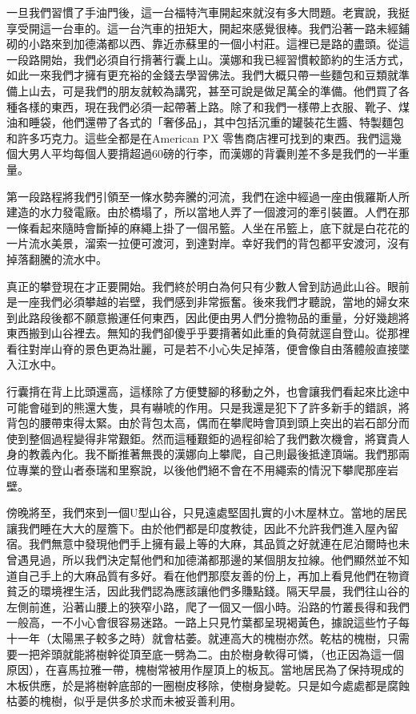 一旦我們習慣了手油門後，這一台福特汽車開起來就沒有多大問題。老實說，我挺享受開這一台車的。這一台汽車的扭矩大，開起來感覺很棒。我們沿著一路未經鋪砌的小路來到加德滿都以西、靠近赤蘇里的一個小村莊。這裡已是路的盡頭。從這一段路開始，我們必須自行揹著行囊上山。漢娜和我已經習慣較節約的生活方式，如此一來我們才擁有更充裕的金錢去學習佛法。我們大概只帶一些麵包和豆類就準備上山去，可是我們的朋友就較為講究，甚至可說是做足萬全的準備。他們買了各種各樣的東西，現在我們必須一起帶著上路。除了和我們一樣帶上衣服、靴子、煤油和睡袋，他們還帶了各式的「奢侈品」，其中包括沉重的罐裝花生醬、特製麵包和許多巧克力。這些全都是在American
PX
零售商店裡可找到的東西。我們這幾個大男人平均每個人要揹超過60磅的行李，而漢娜的背囊則差不多是我們的一半重量。


第一段路程將我們引領至一條水勢奔騰的河流，我們在途中經過一座由俄羅斯人所建造的水力發電廠。由於橋塌了，所以當地人弄了一個渡河的牽引裝置。人們在那一條看起來隨時會斷掉的麻繩上掛了一個吊籃。人坐在吊籃上，底下就是白花花的一片流水美景，溜索一拉便可渡河，到達對岸。幸好我們的背包都平安渡河，沒有掉落翻騰的流水中。

真正的攀登現在才正要開始。我們終於明白為何只有少數人曾到訪過此山谷。眼前是一座我們必須攀越的岩壁，我們感到非常振奮。後來我們才聽說，當地的婦女來到此路段後都不願意搬運任何東西，因此便由男人們分擔物品的重量，分好幾趟將東西搬到山谷裡去。無知的我們卻傻乎乎要揹著如此重的負荷就逕自登山。從那裡看往對岸山脊的景色更為壯麗，可是若不小心失足掉落，便會像自由落體般直接墜入江水中。

行囊揹在背上比頭還高，這樣除了方便雙腳的移動之外，也會讓我們看起來比途中可能會碰到的熊還大隻，具有嚇唬的作用。只是我還是犯下了許多新手的錯誤，將背包的腰帶束得太緊。由於背包太高，偶而在攀爬時會頂到頭上突出的岩石部分而使到整個過程變得非常艱鉅。然而這種艱鉅的過程卻給了我們數次機會，將寶貴人身的教義內化。我不斷推著無畏的漢娜向上攀爬，自己則最後抵達頂端。我們那兩位專業的登山者泰瑞和里察說，以後他們絕不會在不用繩索的情況下攀爬那座岩壁。

傍晚將至，我們來到一個U型山谷，只見遠處堅固扎實的小木屋林立。當地的居民讓我們睡在大大的屋簷下。由於他們都是印度教徒，因此不允許我們進入屋內留宿。我們無意中發現他們手上擁有最上等的大麻，其品質之好就連在尼泊爾時也未曾遇見過，所以我們決定幫他們和加德滿都那邊的某個朋友拉線。他們顯然並不知道自己手上的大麻品質有多好。看在他們那麼友善的份上，再加上看見他們在物資貧乏的環境裡生活，因此我們認為應該讓他們多賺點錢。隔天早晨，我們往山谷的左側前進，沿著山腰上的狹窄小路，爬了一個又一個小時。沿路的竹叢長得和我們一般高，一不小心會很容易迷路。一路上只見竹葉都呈現褐黃色，據說這些竹子每十一年（太陽黑子較多之時）就會枯萎。就連高大的槐樹亦然。乾枯的槐樹，只需要一把斧頭就能將樹幹從頂至底一劈為二。由於樹身軟得可憐，（也正因為這一個原因），在喜馬拉雅一帶，槐樹常被用作屋頂上的板瓦。當地居民為了保持現成的木板供應，於是將樹幹底部的一圈樹皮移除，使樹身變乾。只是如今處處都是腐蝕枯萎的槐樹，似乎是供多於求而未被妥善利用。

